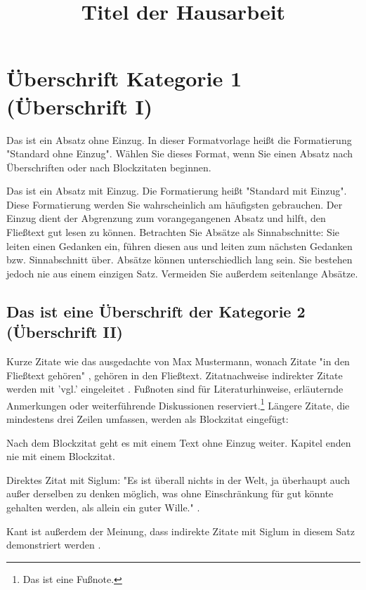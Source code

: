 \documentclass{hausarbeit_philosophie}
\title{Titel der Hausarbeit}
\begin{document}
\maketitle
\tableofcontents
\newpage

\section{Überschrift Kategorie 1 (Überschrift I)}
Das ist ein Absatz ohne Einzug. In dieser Formatvorlage heißt die Formatierung "Standard ohne Einzug". Wählen Sie dieses Format, wenn Sie einen Absatz nach Überschriften oder nach Blockzitaten beginnen.

Das ist ein Absatz mit Einzug. Die Formatierung heißt "Standard mit Einzug". Diese Formatierung werden Sie wahrscheinlich am häufigsten gebrauchen. Der Einzug dient der Abgrenzung zum vorangegangenen Absatz und hilft, den Fließtext gut lesen zu können. Betrachten Sie Absätze als Sinnabschnitte: Sie leiten einen Gedanken ein, führen diesen aus und leiten zum nächsten Gedanken bzw. Sinnabschnitt über. Absätze können unterschiedlich lang sein. Sie bestehen jedoch nie aus einem einzigen Satz. Vermeiden Sie außerdem seitenlange Absätze.

\subsection{Das ist eine Überschrift der Kategorie 2 (Überschrift II)}
Kurze Zitate wie das ausgedachte von Max Mustermann, wonach Zitate "in den Fließtext gehören" \cite[14]{MusZit}, gehören in den Fließtext. Zitatnachweise indirekter Zitate werden mit 'vgl.' eingeleitet . Fußnoten sind für Literaturhinweise, erläuternde Anmerkungen oder weiterführende Diskussionen reserviert.\footnote{Das ist eine Fußnote.} Längere Zitate, die mindestens drei Zeilen umfassen, werden als Blockzitat eingefügt:


Nach dem Blockzitat geht es mit einem Text ohne Einzug weiter. Kapitel enden nie mit einem Blockzitat.

Direktes Zitat mit Siglum: "Es ist überall nichts in der Welt, ja überhaupt auch außer derselben zu denken möglich, was ohne Einschränkung für gut könnte gehalten werden, als allein ein guter Wille." \cite[393]{GMS}.

Kant ist außerdem der Meinung, dass indirekte Zitate mit Siglum in diesem Satz demonstriert werden .

\printbibliography
\end{document}
